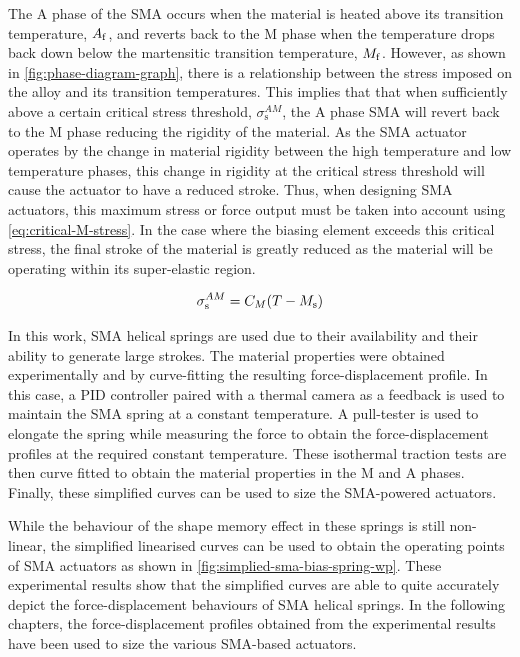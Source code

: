 The A phase of the SMA occurs when the material is heated above its transition temperature, $A_\mathrm{f}$, and reverts back to the M phase when the temperature drops back down below the martensitic transition temperature, $M_\mathrm{f}$. However, as shown in \cref{fig:phase-diagram-graph}, there is a relationship between the stress imposed on the alloy and its transition temperatures. This implies that that when sufficiently above a certain critical stress threshold, $\sigma_\mathrm{s}^{AM}$, the A phase SMA will revert back to the M phase reducing the rigidity of the material. As the SMA actuator operates by the change in material rigidity between the high temperature and low temperature phases, this change in rigidity at the critical stress threshold will cause the actuator to have a reduced stroke. Thus, when designing SMA actuators, this maximum stress or force output must be taken into account using \cref{eq:critical-M-stress}. In the case where the biasing element exceeds this critical stress, the final stroke of the material is greatly reduced as the material will be operating within its super-elastic region.

\begin{equation}\label{eq:critical-M-stress}
    \sigma_\mathrm{s}^{AM} = C_M (T-M_\mathrm{s})
\end{equation}

In this work, SMA helical springs are used due to their availability and their ability to generate large strokes. The material properties were obtained experimentally and by curve-fitting the resulting force-displacement profile. In this case, a PID controller paired with a thermal camera as a feedback is used to maintain the SMA spring at a constant temperature. A pull-tester is used to elongate the spring while measuring the force to obtain the force-displacement profiles at the required constant temperature. These isothermal traction tests are then curve fitted to obtain the material properties in the M and A phases. Finally, these simplified curves can be used to size the SMA-powered actuators.

While the behaviour of the shape memory effect in these springs is still non-linear, the simplified linearised curves can be used to obtain the operating points of SMA actuators as shown in \cref{fig:simplied-sma-bias-spring-wp}. These experimental results show that the simplified curves are able to quite accurately depict the force-displacement behaviours of SMA helical springs. In the following chapters, the force-displacement profiles obtained from the experimental results have been used to size the various SMA-based actuators.

